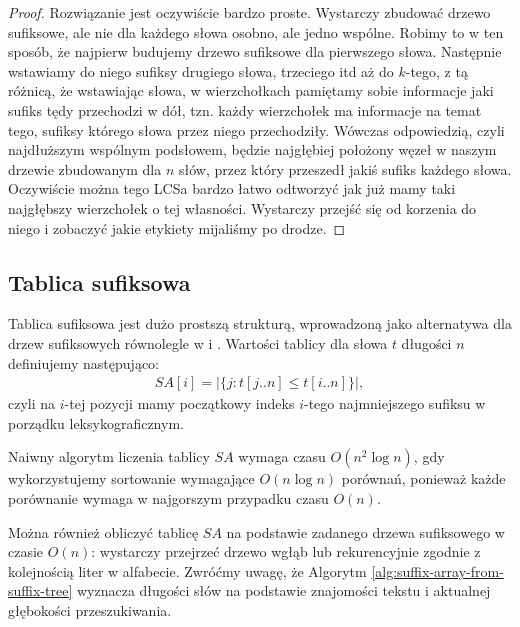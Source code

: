 \begin{proof}
Rozwiązanie jest oczywiście bardzo proste. Wystarczy zbudować drzewo sufiksowe, ale nie dla każdego słowa osobno, ale jedno wspólne. Robimy to w ten sposób, że najpierw budujemy drzewo sufiksowe dla pierwszego słowa. Następnie wstawiamy do niego sufiksy drugiego słowa, trzeciego itd aż do $k$-tego, z tą różnicą, że wstawiając słowa, w wierzchołkach pamiętamy sobie informacje jaki sufiks tędy przechodzi w dół, tzn. każdy wierzchołek ma informacje na temat tego, sufiksy którego słowa przez niego przechodziły. Wówczas odpowiedzią, czyli najdłuższym wspólnym podsłowem, będzie najgłębiej położony węzeł w naszym drzewie zbudowanym dla $n$ słów, przez który przeszedł jakiś sufiks każdego słowa. Oczywiście można tego LCSa bardzo łatwo odtworzyć jak już mamy taki najgłębszy wierzchołek o tej własności. Wystarczy przejść się od korzenia do niego i zobaczyć jakie etykiety mijaliśmy po drodze.
\end{proof}


\subsection{Tablica sufiksowa}

Tablica sufiksowa jest dużo prostszą strukturą, wprowadzoną jako alternatywa dla drzew sufiksowych równolegle w \citep{gonnet1992new} i \citep{manber1993suffix}.
Wartości tablicy dla słowa $t$ długości $n$ definiujemy następująco:
\begin{align*}
    SA[i] = |\{j: t[j..n] \le t[i..n]\}|,
\end{align*}
czyli na $i$-tej pozycji mamy początkowy indeks $i$-tego najmniejszego sufiksu w porządku leksykograficznym.

Naiwny algorytm liczenia tablicy $SA$ wymaga czasu $O(n^2 \log{n})$, gdy wykorzystujemy sortowanie wymagające $O(n \log{n})$ porównań, ponieważ każde porównanie wymaga w najgorszym przypadku czasu $O(n)$.

Można również obliczyć tablicę $SA$ na podstawie zadanego drzewa sufiksowego w czasie $O(n)$: wystarczy przejrzeć drzewo wgłąb lub rekurencyjnie zgodnie z kolejnością liter w alfabecie. Zwróćmy uwagę, że Algorytm \ref{alg:suffix-array-from-suffix-tree} wyznacza długości słów na podstawie znajomości tekstu i aktualnej głębokości przeszukiwania.

\begin{code}
\inputminted{python}{code/suffix-array/from-suffix-tree.py}
\label{alg:suffix-array-from-suffix-tree}
\end{code}

